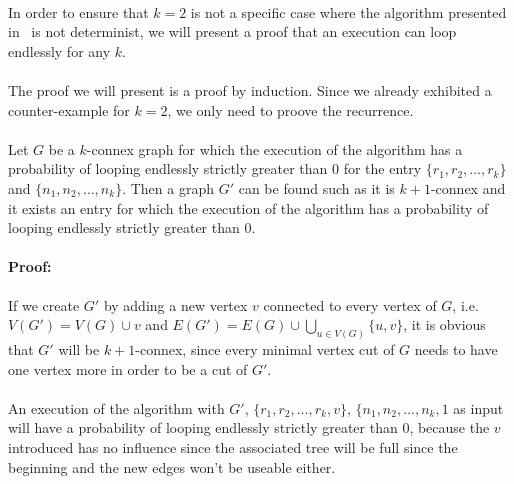 \paragraph{}
In order to ensure that $k=2$ is not a specific case where the algorithm
presented in~\cite{JS94} is not determinist, we will present a proof that an
execution can loop endlessly for any $k$.

\paragraph{}
The proof we will present is a proof by induction. Since we already exhibited
a counter-example for $k=2$, we only need to proove the recurrence.

\paragraph{}
Let $G$ be a $k$-connex graph for which the execution of the algorithm has a
probability of looping endlessly strictly greater than $0$ for the entry
$\{r_1,r_2, \dots, r_k\}$ and $\{n_1,n_2, \dots, n_k\}$. Then a graph $G'$ can
be found such as it is $k+1$-connex and it exists an entry for which the
execution of the algorithm has a probability of looping endlessly strictly
greater than $0$.

\paragraph{Proof:}
If we create $G'$ by adding a new vertex $v$ connected to every vertex of $G$,
i.e. $V(G') = V(G) \cup v$ and
$E(G') = E(G) \cup \bigcup \limits_{u \in V(G)} \{u,v\}$, it is obvious that
$G'$ will be $k+1$-connex, since every minimal vertex cut of $G$ needs to have
 one vertex more in order to be a cut of $G'$.

\paragraph{}
An execution of the algorithm with $G'$, $\{r_1,r_2, \dots, r_k, v\}$,
$\{n_1,n_2, \dots, n_k, 1$ as input will have a probability of looping
endlessly strictly greater than $0$, because the $v$ introduced has no influence
since the associated tree will be full since the beginning and the new edges
won't be useable either.
